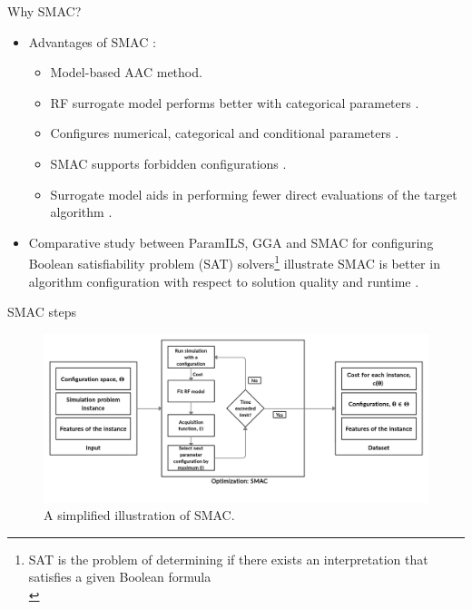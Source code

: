 \documentclass[10pt]{beamer}
\begin{document}
\begin{frame}[t]{Why SMAC?}


\begin{itemize}
\item Advantages of SMAC \cite{SMAC_mainpaper} \cite{Hutterphd}:
\begin{itemize}
\item Model-based AAC method.
\item RF surrogate model performs better with categorical parameters \cite{Hutterphd} \cite{SMAC_mainpaper}.
\item Configures numerical, categorical and conditional parameters \cite{SMAC_mainpaper}. 
\item SMAC supports forbidden configurations \cite{SMAC_mainpaper}.
\item Surrogate model aids in performing fewer direct evaluations of the target algorithm \cite{BayesianOptimization_papertutorials}.
\newline
\end{itemize}

\item Comparative study between ParamILS, GGA and SMAC for configuring Boolean satisfiability problem (SAT) solvers\footnote{SAT is the problem of determining if there exists an interpretation that satisfies a given Boolean formula\\} illustrate \color{red} SMAC is better in algorithm configuration with respect to solution quality and runtime \color{black}\cite{SMAC_ParamILS_GGA_compare}. 

\end{itemize}
\end{frame}{}

\begin{frame}{SMAC steps}

\begin{figure}
\centering
\includegraphics[width=\textwidth]{images/SMAC_simplified_new.jpg}
\captionsetup{justification=justified,margin=0.2cm}
\caption{A simplified illustration of SMAC.}
\end{figure}
    
\end{frame}
\end{document}
